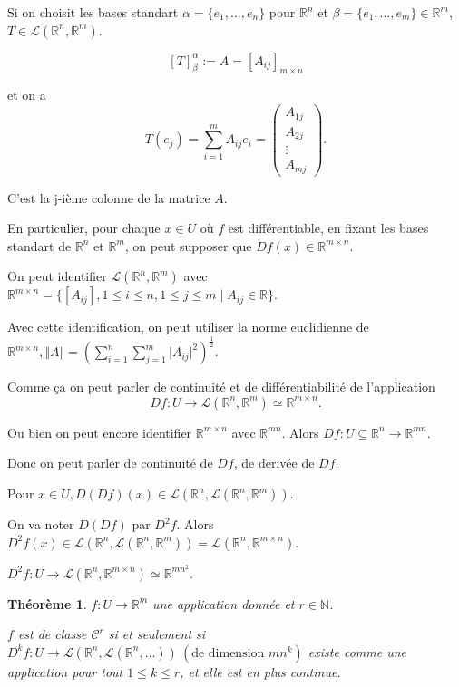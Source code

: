 \documentclass[french]{article}
\newtheorem{prototheorem}{Théorème}[section]
\newenvironment{thm}
   {\colorlet{shadecolor}{orange!10}\begin{shaded}\begin{prototheorem}}
   {\end{prototheorem}\end{shaded}}
\theoremstyle{definition}
\theoremstyle{remark}
\begin{document}
Si on choisit les bases standart $\alpha = \{ e_1, \dots, e_n \} $ pour $ \mathbb{R}^n$ et $ \beta = \{ e_1, \dots, e_m \} \in \mathbb{R}^m $, $T \in \mathscr{L}(\mathbb{R}^n, \mathbb{R}^m) $.

$$ [T] _{\beta } ^{\alpha} := A = [A _{ij}] _{m \times n}$$

et on a $$ T(e_j) = \sum_{i=1}^{m} A _{ij} e_i  = \begin{pmatrix}
  A _{1j} \\
  A _{2j} \\
  \vdots \\
  A _{mj}
\end{pmatrix}.$$

C'est la j-ième colonne de la matrice $A$.

En particulier, pour chaque $x \in U$ où $f$ est différentiable, en fixant les bases standart de $\mathbb{R}^n$ et $\mathbb{R}^m$, on peut supposer que $Df(x) \in \mathbb{R} ^{m \times n}$.

On peut identifier $\mathscr{L}(\mathbb{R}^n, \mathbb{R}^m) $ avec $\mathbb{R} ^{m \times n} = \{ [A _{ij}], 1 \leq i \leq n, 1 \leq j \leq m \mid A _{ij} \in \mathbb{R}\} $.

Avec cette identification, on peut utiliser la norme euclidienne de $\mathbb{R} ^{m \times n}, \Vert A \Vert = \left( \sum_{i=1}^{n} \sum_{j=1}^{m} \lvert A _{ij} \rvert ^2 \right) ^{\frac{1}{2}}  $.

Comme ça on peut parler de continuité et de différentiabilité de l'application $$Df : U \to \mathscr{L}(\mathbb{R}^n, \mathbb{R}^m) \simeq \mathbb{R}^{m\times n}.$$

Ou bien on peut encore identifier $\mathbb{R} ^{m \times n}$ avec $\mathbb{R} ^{mn}$. Alors $Df : U \subseteq \mathbb{R}^n \to \mathbb{R} ^{mn}$.

Donc on peut parler de continuité de $Df $, de derivée de $Df$.

Pour $x \in U, D(Df)(x) \in \mathscr{L}(\mathbb{R}^n, \mathscr{L}(\mathbb{R}^n, \mathbb{R}^m) ) $.

On va noter $D(Df)$ par $D ^2f$. Alors $D ^2 f (x) \in \mathscr{L}(\mathbb{R}^n, \mathscr{L}(\mathbb{R}^n, \mathbb{R}^m) ) = \mathscr{L}(\mathbb{R}^n, \mathbb{R}^{m\times n})  $.

$D ^2 f : U \to \mathscr{L}(\mathbb{R}^n, \mathbb{R} ^{m \times n}) \simeq \mathbb{R} ^{mn ^2} $.

\begin{thm}
  $f : U \to \mathbb{R}^m$ une application donnée et $r \in \mathbb{N}$.

  $f$ est de classe $\mathcal{C}^r$ si et seulement si $D ^{k} f : U \to \mathscr{L}(\mathbb{R}^n, \mathscr{L}(\mathbb{R}^n, \dots) ) \ (\text{de dimension } mn ^{k}) $ existe comme une application pour tout $1 \leq  k \leq r$, et elle est en plus continue.
\end{thm}
\end{document}
